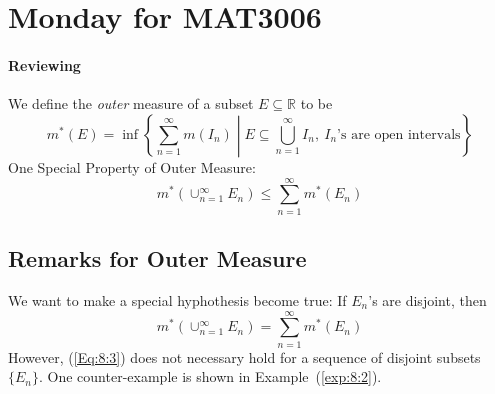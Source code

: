 
\section{Monday for MAT3006}


\paragraph{Reviewing}
We define the \emph{outer} measure of a subset $E\subseteq\mathbb{R}$ to be
\[
m^*(E)
=
\inf\left\{
\sum_{n=1}^\infty m(I_n)
\middle|
E\subseteq\bigcup_{n=1}^\infty I_n,\ \text{$I_n$'s are open intervals}
\right\}
\]
One Special Property of Outer Measure:
\[
m^*(\cup_{n=1}^\infty E_n)\le\sum_{n=1}^\infty m^*(E_n)
\]
\subsection{Remarks for Outer Measure}
We want to make a special hyphothesis become true:
If $E_n$'s are disjoint, then
\begin{equation}\label{Eq:8:3}
m^*(\cup_{n=1}^\infty E_n)=\sum_{n=1}^\infty m^*(E_n)
\end{equation}
However, (\ref{Eq:8:3}) does not necessary hold for a sequence of disjoint subsets $\{E_n\}$.
One counter-example is shown in Example~(\ref{exp:8:2}).

